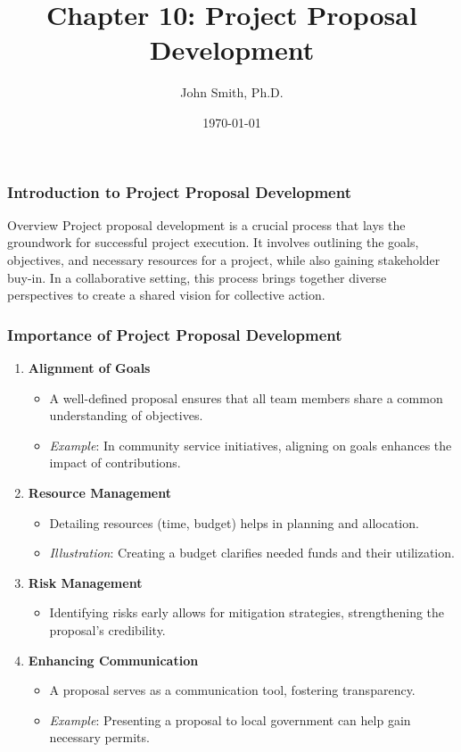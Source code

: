 \documentclass[aspectratio=169]{beamer}
\title[Project Proposal Development]{Chapter 10: Project Proposal Development}
\author[J. Smith]{John Smith, Ph.D.}
\institute[University Name]{
  Department of Computer Science\\
  University Name\\
  \vspace{0.3cm}
  Email: email@university.edu\\
  Website: www.university.edu
}
\date{\today}
\begin{document}
\frame{\titlepage}

\begin{frame}[fragile]
    \frametitle{Introduction to Project Proposal Development}
    \begin{block}{Overview}
        Project proposal development is a crucial process that lays the groundwork for successful project execution. 
        It involves outlining the goals, objectives, and necessary resources for a project, while also gaining stakeholder buy-in. 
        In a collaborative setting, this process brings together diverse perspectives to create a shared vision for collective action.
    \end{block}
\end{frame}

\begin{frame}[fragile]
    \frametitle{Importance of Project Proposal Development}
    \begin{enumerate}
        \item \textbf{Alignment of Goals}
            \begin{itemize}
                \item A well-defined proposal ensures that all team members share a common understanding of objectives.
                \item \textit{Example}: In community service initiatives, aligning on goals enhances the impact of contributions.
            \end{itemize}
        
        \item \textbf{Resource Management}
            \begin{itemize}
                \item Detailing resources (time, budget) helps in planning and allocation.
                \item \textit{Illustration}: Creating a budget clarifies needed funds and their utilization.
            \end{itemize}

        \item \textbf{Risk Management}
            \begin{itemize}
                \item Identifying risks early allows for mitigation strategies, strengthening the proposal’s credibility.
            \end{itemize}

        \item \textbf{Enhancing Communication}
            \begin{itemize}
                \item A proposal serves as a communication tool, fostering transparency.
                \item \textit{Example}: Presenting a proposal to local government can help gain necessary permits.
            \end{itemize}
    \end{enumerate}
\end{frame}
\end{document}

